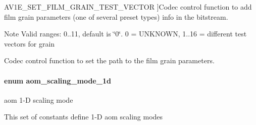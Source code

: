 \begin{Desc}
\begin{description}
{A\+V1\+E\+\_\+\+S\+E\+T\+\_\+\+F\+I\+L\+M\+\_\+\+G\+R\+A\+I\+N\+\_\+\+T\+E\+S\+T\+\_\+\+V\+E\+C\+T\+OR\hypertarget{group__aom__encoder_ggae78dde67a6d78f332e9bdba0dde42db5a437e6b282a2395b4b08a9acde3e41cfb}{}\label{group__aom__encoder_ggae78dde67a6d78f332e9bdba0dde42db5a437e6b282a2395b4b08a9acde3e41cfb}
}]Codec control function to add film grain parameters (one of several preset types) info in the bitstream. \begin{DoxyNote}{Note}
Valid ranges\+: 0..11, default is \char`\"{}0\char`\"{}. 0 = U\+N\+K\+N\+O\+WN, 1..16 = different test vectors for grain 
\end{DoxyNote}
\item[{\em 
A\+V1\+E\+\_\+\+S\+E\+T\+\_\+\+F\+I\+L\+M\+\_\+\+G\+R\+A\+I\+N\+\_\+\+T\+A\+B\+LE\hypertarget{group__aom__encoder_ggae78dde67a6d78f332e9bdba0dde42db5ad5846c6f49d37e65a03c39e68d487097}{}\label{group__aom__encoder_ggae78dde67a6d78f332e9bdba0dde42db5ad5846c6f49d37e65a03c39e68d487097}
}]Codec control function to set the path to the film grain parameters. \end{description}
\end{Desc}
\paragraph[{\texorpdfstring{aom\+\_\+scaling\+\_\+mode\+\_\+1d}{aom_scaling_mode_1d}}]{\setlength{\rightskip}{0pt plus 5cm}enum {\bf aom\+\_\+scaling\+\_\+mode\+\_\+1d}}\hypertarget{group__aom__encoder_ga2a1791d26fca39303154f0f9ece3e295}{}\label{group__aom__encoder_ga2a1791d26fca39303154f0f9ece3e295}


aom 1-\/D scaling mode 

This set of constants define 1-\/D aom scaling modes 
